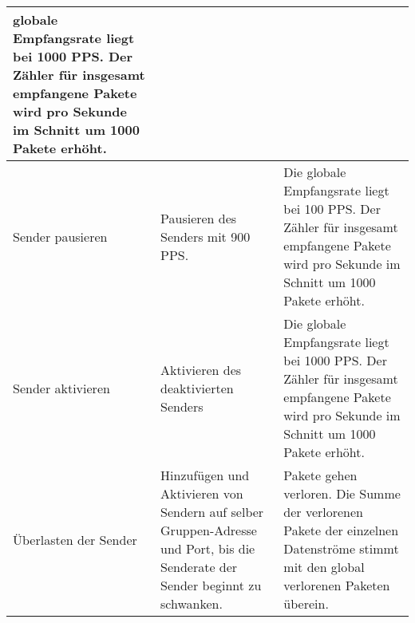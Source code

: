\begin{table}[h]
\begin{center}
\begin{tabular}{|p{2.5cm}|p{5cm}|p{7.55cm}|}
                    globale Empfangsrate liegt bei 1000 PPS. Der Zähler für
                    insgesamt empfangene Pakete wird pro Sekunde im Schnitt um
                    1000 Pakete erhöht.\\
                \hline
                    Sender pausieren & Pausieren des Senders mit 900 PPS. & Die
                    globale Empfangsrate liegt bei 100 PPS. Der Zähler für
                    insgesamt empfangene Pakete wird pro Sekunde im Schnitt um
                    1000 Pakete erhöht.\\
                \hline
                    Sender aktivieren & Aktivieren des deaktivierten Senders & 
                    Die globale Empfangsrate liegt bei 1000 PPS. Der Zähler für
                    insgesamt empfangene Pakete wird pro Sekunde im Schnitt um
                    1000 Pakete erhöht.\\
                \hline
                    Überlasten der Sender & Hinzufügen und Aktivieren von
                    Sendern auf selber Gruppen-Adresse und Port, bis die
                    Senderate der Sender beginnt zu schwanken. & Pakete gehen
                    verloren. Die Summe der verlorenen Pakete der einzelnen
                    Datenströme stimmt mit den global verlorenen Paketen
                    überein.\\
                \hline
            \end{tabular}
        \end{center}
    \end{table}
    
